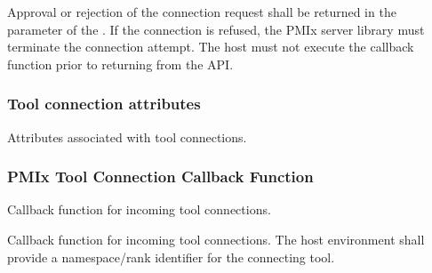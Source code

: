 Approval or rejection of the connection request shall be returned in the
 parameter of the . If
the connection is refused, the \ac{PMIx} server library must terminate the
connection attempt. The host must not execute the callback function prior to
returning from the \ac{API}.

\subsubsection{Tool connection attributes}

Attributes associated with tool connections.

%
%
%

\subsubsection{PMIx Tool Connection Callback Function}

\summary

Callback function for incoming tool connections.

\format


\begin{arglist}
\end{arglist}

\descr

Callback function for incoming tool connections.
The host environment shall provide a namespace/rank identifier for the connecting tool.

